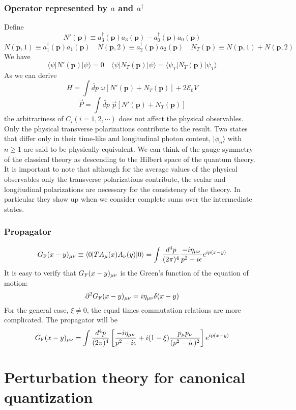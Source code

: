 \subsubsection{Operator represented by $a$ and $a^{\dagger}$}
Define
\[N'(\bm{p}) \equiv a^{\dagger}_{3}(\bm{p})a_{3}(\bm{p})-a^{\dagger}_{0}(\bm{p})a_{0}(\bm{p})\]
\[N(\bm{p},1) \equiv a^{\dagger}_{1}(\bm{p}) a_{1}(\bm{p}) \quad N(\bm{p},2) \equiv a^{\dagger}_{2}(\bm{p}) a_{2}(\bm{p}) \quad N_T(\bm{p}) \equiv N(\bm{p},1) + N(\bm{p},2)\]
We have
\[\langle \psi | N'(\bm{p}) | \psi\rangle = 0 \quad \langle \psi | N_T(\bm{p}) | \psi\rangle = \langle \psi_T | N_T(\bm{p}) | \psi_T\rangle\]
As we can derive
\[ H = \int \widetilde{dp} \; \omega [N'(\bm{p}) + N_T(\bm{p})] + 2\mathcal{E}_0V\]
\[ \vec{P} = \int \widetilde{dp} \; \vec{p} [N'(\bm{p}) + N_T(\bm{p})]\]
the arbitrariness of $C_i(i=1,2,\cdots)$ does not affect the physical observables. Only the physical transverse polarizations
contribute to the result. Two states that differ only in their time-like and longitudinal photon content, $|\phi_n\rangle$ with $n \geq 1$ are said to be physically equivalent. We can think of the gauge symmetry of the classical theory as descending to the Hilbert space of the quantum theory.
\\
It is important to note that although for the average values of the physical observables only the transverse polarizations contribute, the scalar and longitudinal polarizations are necessary for the consistency of the theory. In particular they show up when we consider complete sums over the intermediate states.

\subsubsection{Propagator}
\[G_{\rm F}(x-y)_{\mu\nu} \equiv \langle 0 |T A_{\mu}(x) A_{\nu}(y) | 0 \rangle = \int \frac{d^4p}{(2\pi)^4} \frac{-i\eta_{\mu\nu}}{p^2-i\epsilon}  e^{ip(x-y)}\]
It is easy to verify that $G_{\rm F}(x-y)_{\mu\nu}$ is the Green's function of the equation of motion:
\[\partial^2 G_{\rm F}(x-y)_{\mu\nu} = i\eta_{\mu\nu}\delta(x-y)\]
For the general case, $\xi \neq 0$, the equal times commutation relations are more complicated. The propagator will be
\[G_{\rm F}(x-y)_{\mu\nu}  = \int \frac{d^4p}{(2\pi)^4} \left[\frac{-i\eta_{\mu\nu}}{p^2-i\epsilon} + i(1-\xi)\frac{p_{\mu}p_{\nu}}{(p^2-i\epsilon)^2}\right] e^{ip(x-y)}\]

\section{Perturbation theory for canonical quantization}
